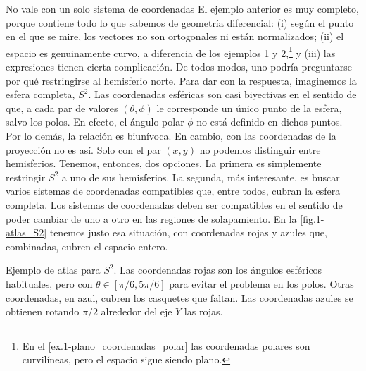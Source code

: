 \begin{observation}
    {No vale con un solo sistema de coordenadas}
    \label{obs.1-atlas}
    El ejemplo anterior es muy completo, porque contiene todo lo que sabemos de geometría diferencial: (i) según el punto en el que se mire, los vectores no son ortogonales ni están normalizados; (ii) el espacio es genuinamente curvo, a diferencia de los ejemplos 1 y 2,\footnote{En el \cref{ex.1-plano_coordenadas_polar} las coordenadas polares son curvilíneas, pero el espacio sigue siendo plano.} y (iii) las expresiones tienen cierta complicación. De todos modos, uno podría preguntarse por qué restringirse al hemisferio norte. Para dar con la respuesta, imaginemos la esfera completa, \(S^2\). Las coordenadas esféricas son casi biyectivas en el sentido de que, a cada par de valores \((\theta, \phi)\) le corresponde un único punto de la esfera, salvo los polos. En efecto, el ángulo polar \(\phi\) no está definido en dichos puntos. Por lo demás, la relación es biunívoca. En cambio, con las coordenadas de la proyección no es así. Solo con el par \((x, y)\) no podemos distinguir entre hemisferios. Tenemos, entonces, dos opciones. La primera es simplemente restringir \(S^2\) a uno de sus hemisferios. La segunda, más interesante, es buscar varios sistemas de coordenadas compatibles que, entre todos, cubran la esfera completa. Los sistemas de coordenadas deben ser compatibles en el sentido de poder cambiar de uno a otro en las regiones de solapamiento. En la \cref{fig.1-atlas_S2} tenemos justo esa situación, con coordenadas rojas y azules que, combinadas, cubren el espacio entero. 
    
    \begin{figbox}
        {Ejemplo de atlas para \(S^2\). Las coordenadas rojas son los ángulos esféricos habituales, pero con \(\theta\in[\pi/6, 5\pi/6]\) para evitar el problema en los polos. Otras coordenadas, en azul, cubren los casquetes que faltan. Las coordenadas azules se obtienen rotando \(\pi/2\) alrededor del eje \(Y\) las rojas.
        \label{fig.1-atlas_S2}}
        
    \end{figbox}
    
\end{observation}

